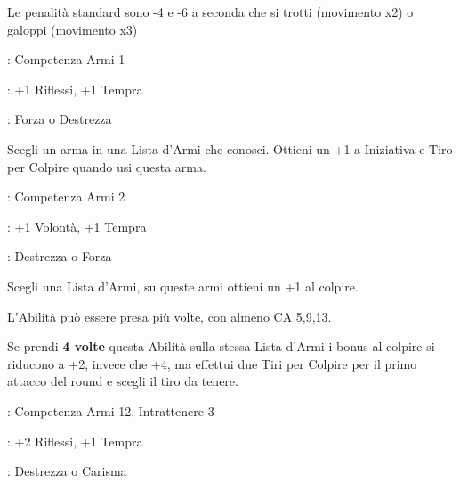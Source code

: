 \begin{multicols}{2}
Le penalità standard sono -4 e -6 a seconda che si trotti (movimento x2) o galoppi (movimento x3)

\begin{description}[noitemsep, topsep=0pt, parsep=0pt, partopsep=0pt, leftmargin=0cm, labelwidth=2.5cm]
    \item[\textbf{Requisito}]: Competenza Armi 1
    \item[\textbf{Tiri Salvezza}]: +1 Riflessi, +1 Tempra
    \item[\textbf{Caratteristica}]: Forza o Destrezza
\end{description}

Scegli un arma in una Lista d'Armi che conosci. Ottieni un +1 a Iniziativa e Tiro per Colpire quando usi questa arma.




\begin{description}[noitemsep, topsep=0pt, parsep=0pt, partopsep=0pt, leftmargin=0cm, labelwidth=2.5cm]
    \item[\textbf{Requisito}]: Competenza Armi 2
    \item[\textbf{Tiri Salvezza}]: +1 Volontà, +1 Tempra
    \item[\textbf{Caratteristica}]: Destrezza o Forza
\end{description}

Scegli una Lista d'Armi, su queste armi ottieni un +1 al colpire.

L'Abilità può essere presa più volte, con almeno CA 5,9,13.

Se prendi \textbf{4 volte} questa Abilità sulla stessa Lista d'Armi i bonus al colpire si riducono a +2, invece che +4, ma effettui due Tiri per Colpire per il primo attacco del round e scegli il tiro da tenere.

\begin{description}[noitemsep, topsep=0pt, parsep=0pt, partopsep=0pt, leftmargin=0cm, labelwidth=2.5cm]
    \item[\textbf{Requisito}]: Competenza Armi 12, Intrattenere 3
    \item[\textbf{Tiri Salvezza}]: +2 Riflessi, +1 Tempra
    \item[\textbf{Caratteristica}]: Destrezza o Carisma
\end{description}


\end{multicols}
